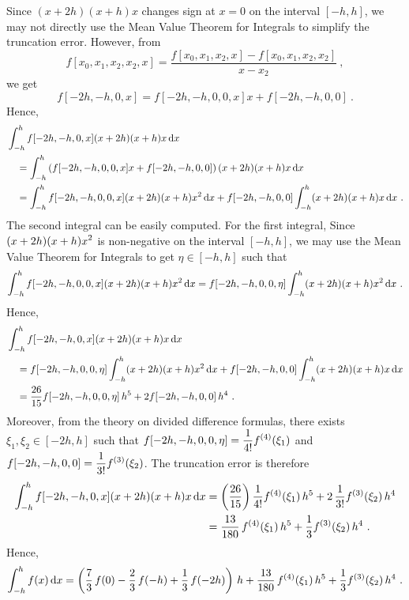 {Since $(x+2h)(x+h)x$ changes sign at $x=0$ on the interval $[-h,h]$, we
may not directly use the Mean Value Theorem for Integrals to simplify
the truncation error.  However, from
\[
f[x_0,x_1,x_2,x_2,x] = \frac{f[x_0,x_1,x_2,x] - f[x_0,x_1,x_2,x_2]}{x-x_2} \ ,
\]
we get
\[
f[-2h,-h,0,x] = f[-2h,-h,0,0,x] x + f[-2h,-h,0,0] \ .
\]
Hence,
\begin{align*}
&\int_{-h}^h f[-2h,-h,0,x] (x+2h)(x+h)x \,\mathrm{d}x \\
&\quad = \int_{-h}^h
\left( f[-2h,-h,0,0,x] x + f[-2h,-h,0,0] \right)
(x+2h)(x+h)x \,\mathrm{d}x \\
&\quad = \int_{-h}^h f[-2h,-h,0,0,x] (x+2h)(x+h)x^2 \,\mathrm{d}x
+f[-2h,-h,0,0] \int_{-h}^h (x+2h)(x+h)x \,\mathrm{d}x \ .
\end{align*}
The second integral can be easily computed.  For the first integral,
Since $\displaystyle (x+2h)(x+h)x^2$ is non-negative on the interval
$[-h,h]$, we may use the Mean Value Theorem for Integrals to get $\eta
\in [-h,h]$ such that
\[
\int_{-h}^h f[-2h,-h,0,0,x] (x+2h)(x+h)x^2 \,\mathrm{d}x
= f[-2h,-h,0,0,\eta] \int_{-h}^h(x+2h)(x+h)x^2 \,\mathrm{d}x \ .
\]
Hence,
\begin{align*}
&\int_{-h}^h f[-2h,-h,0,x] (x+2h)(x+h)x \,\mathrm{d}x \\
&\quad = f[-2h,-h,0,0,\eta] \int_{-h}^h (x+2h)(x+h)x^2 \,\mathrm{d}x
 + f[-2h,-h,0,0] \int_{-h}^h (x+2h)(x+h)x \,\mathrm{d}x \\
&\quad = \frac{26}{15} f[-2h,-h,0,0,\eta]\,h^5 + 2 f[-2h,-h,0,0]\,h^4 \ .
\end{align*}
Moreover, from the theory on divided difference formulas, there exists
$\xi_1, \xi_2 \in [-2h,h]$ such that
$\displaystyle f[-2h,-h,0,0,\eta] = \frac{1}{4!} f^{(4)}(\xi_1)$
and
$\displaystyle f[-2h,-h,0,0] = \frac{1}{3!} f^{(3)}(\xi_2)$.
The truncation error is therefore
\begin{align*}
\int_{-h}^h f[-2h,-h,0,x] (x+2h)(x+h)x \,\mathrm{d}x 
&= \left(\frac{26}{15}\right) \frac{1}{4!} f^{(4)}(\xi_1)\, h^5
+ 2 \,\frac{1}{3!} f^{(3)}(\xi_2)\, h^4 \\
&= \frac{13}{180} \, f^{(4)}(\xi_1)\,h^5 + \frac{1}{3} f^{(3)}(\xi_2)\,h^4 \ .
\end{align*}
Hence,
\begin{equation}\label{Questformula1}
\int_{-h}^h f(x) \,\mathrm{d}x
= \left(\frac{7}{3}\,f(0) - \frac{2}{3}\,f(-h) +
\frac{1}{3}\,f(-2h)\right)\,h
+ \frac{13}{180} \, f^{(4)}(\xi_1)\,h^5 + \frac{1}{3} f^{(3)}(\xi_2)\,h^4 \ .
\end{equation}

}
